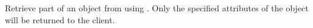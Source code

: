 Retrieve part of an object from  using .  Only the
specified attributes of the object will be returned to the client.
